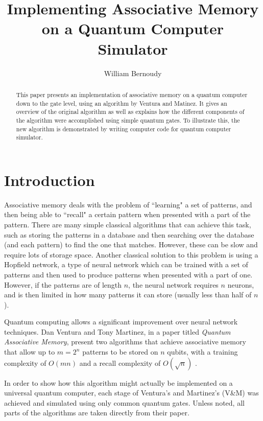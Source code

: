 \documentclass[11pt]{article}
\title{\textbf{Implementing Associative Memory on a Quantum Computer Simulator}}
\author{William Bernoudy}
\date{}
\begin{document}
\maketitle

\begin{abstract}

This paper presents an implementation of associative memory on a quantum computer down to the gate level, using an algorithm by Ventura and Matinez. It gives an overview of the original algorithm as well as explains how the different components of the algorithm were accomplished using simple quantum gates. To illustrate this, the new algorithm is demonstrated by writing computer code for  quantum computer simulator.

\end{abstract}

\section{Introduction}

Associative memory deals with the problem of ``learning" a set of patterns, and then being able to ``recall" a certain pattern when presented with a part of the pattern. There are many simple classical algorithms that can achieve this task, such as storing the patterns in a database and then searching over the database (and each pattern) to find the one that matches. However, these can be slow and require lots of storage space. Another classical solution to this problem is using a Hopfield network, a type of neural network which can be trained with a set of patterns and then used to produce patterns when presented with a part of one. However, if the patterns are of length $n$, the neural network requires $n$ neurons, and is then limited in how many patterns it can store (usually less than half of $n$).

Quantum computing allows a significant improvement over neural network techniques. Dan Ventura and Tony Martinez, in a paper titled \textit{Quantum Associative Memory}, present two algorithms that achieve associative memory that allow up to $m=2^n$ patterns to be stored on $n$ qubits, with a training complexity of $O(mn)$ and a recall complexity of $O(\sqrt{n})$ \cite{Ven00}.

In order to show how this algorithm might actually be implemented on a universal quantum computer, each stage of Ventura's and Martinez's (V\&M) was achieved and simulated using only common quantum gates. Unless noted, all parts of the algorithms are taken directly from their paper.
\end{document}
